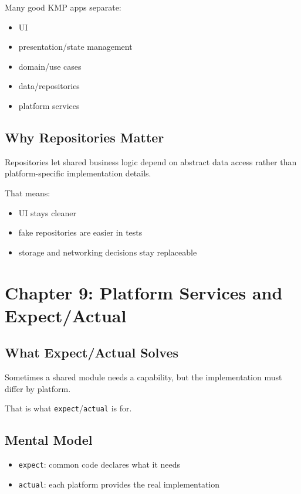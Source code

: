 \documentclass[11pt,a4paper]{article}
\begin{document}
Many good KMP apps separate:
\begin{itemize}
    \item UI
    \item presentation/state management
    \item domain/use cases
    \item data/repositories
    \item platform services
\end{itemize}

\subsection{Why Repositories Matter}

Repositories let shared business logic depend on abstract data access rather than platform-specific implementation details.

That means:
\begin{itemize}
    \item UI stays cleaner
    \item fake repositories are easier in tests
    \item storage and networking decisions stay replaceable
\end{itemize}

\section{Chapter 9: Platform Services and Expect/Actual}

\subsection{What Expect/Actual Solves}

Sometimes a shared module needs a capability, but the implementation must differ by platform.

That is what \texttt{expect}/\texttt{actual} is for.

\subsection{Mental Model}

\begin{itemize}
    \item \texttt{expect}: common code declares what it needs
    \item \texttt{actual}: each platform provides the real implementation
\end{itemize}
\end{document}
